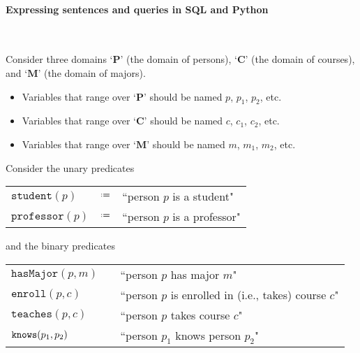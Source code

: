 \documentclass[12pt]{exam}
\newcommand{\knows}[2]{\mbox{\tt knows}(#1,#2)}
\newcommand{\teaches}[2]{\mathtt{teaches}(#1,#2)}
\newcommand{\enroll}[2]{\mathtt{enroll}(#1,#2)}
\newcommand{\student}[1]{\mathtt{student}(#1)}
\newcommand{\major}[2]{\mathtt{hasMajor}(#1,#2)}
\newcommand{\professor}[1]{\mathtt{professor}(#1)}
\newcommand*{\defeq}{\mathrel{\vcenter{\baselineskip0.5ex \lineskiplimit0pt
                     \hbox{\scriptsize.}\hbox{\scriptsize.}}}%
                     =}
\newcommand{\<}{\langle}
\renewcommand{\>}{\rangle}
\theoremstyle{definition}   %
\begin{document}
\begin{questions}

\newpage
\paragraph{Expressing sentences and queries in SQL and Python} \ 


\noindent
Consider three domains `$\mathbf{P}$' (the domain of persons), `$\mathbf{C}$' (the domain of courses),
and `$\mathbf{M}$' (the domain of majors).

\begin{itemize}
\item Variables that range over `$\mathbf{P}$' should be named $p$, $p_1$, $p_2$, etc.
\item Variables that range over `$\mathbf{C}$' should be named $c$, $c_1$, $c_2$, etc.
\item Variables that range over `$\mathbf{M}$' should be named $m$, $m_1$, $m_2$, etc.
\end{itemize}


Consider the unary predicates
\begin{center}
\begin{tabular}{lcl}
$\student{p}$ & $\defeq$ & ``person $p$ is a student"\\
$\professor{p}$ & $\defeq$ & ``person $p$ is a professor"\\
\end{tabular}
\end{center}
and the binary predicates
\begin{center}
\begin{tabular}{lcl}
$\major{p}{m}$& &  ``person $p$ has major $m$"\\
$\enroll{p}{c}$ &&  ``person $p$ is enrolled in (i.e., takes) course $c$" \\
$\teaches{p}{c}$ &&  ``person $p$ takes course $c$" \\
$\knows{p_1}{p_2}$ &&  ``person $p_1$ knows person $p_2$" \\
\end{tabular}
\end{center}





\end{questions}
\end{document}
